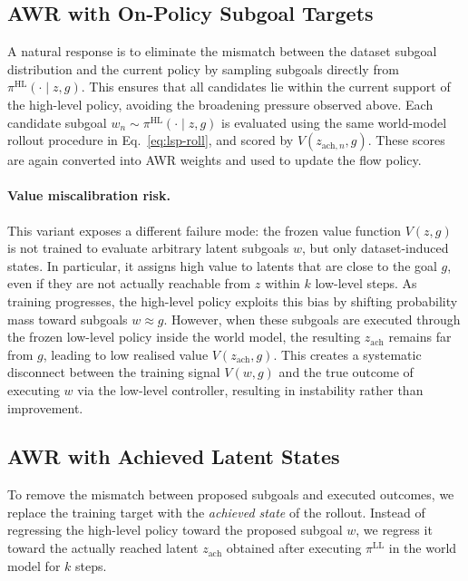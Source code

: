 \subsection{AWR with On-Policy Subgoal Targets}
\label{sec:lsp-awr-self}

A natural response is to eliminate the mismatch between the dataset subgoal distribution and the current policy by sampling subgoals directly from $\pi^{\mathrm{HL}}(\cdot \mid z,g)$. This ensures that all candidates lie within the current support of the high-level policy, avoiding the broadening pressure observed above.
Each candidate subgoal $w_n \sim \pi^{\mathrm{HL}}(\cdot \mid z,g)$ is evaluated using the same world-model rollout procedure in Eq.~\eqref{eq:lsp-roll}, and scored by $V(z_{\mathrm{ach},n}, g)$. These scores are again converted into AWR weights and used to update the flow policy.

\paragraph{Value miscalibration risk.}
This variant exposes a different failure mode: the frozen value function $V(z,g)$ is not trained to evaluate arbitrary latent subgoals $w$, but only dataset-induced states. In particular, it assigns high value to latents that are close to the goal $g$, even if they are not actually reachable from $z$ within $k$ low-level steps.
As training progresses, the high-level policy exploits this bias by shifting probability mass toward subgoals $w \approx g$. However, when these subgoals are executed through the frozen low-level policy inside the world model, the resulting $z_{\mathrm{ach}}$ remains far from $g$, leading to low realised value $V(z_{\mathrm{ach}}, g)$. This creates a systematic disconnect between the training signal $V(w,g)$ and the true outcome of executing $w$ via the low-level controller, resulting in instability rather than improvement.

\subsection{AWR with Achieved Latent States}
\label{sec:lsp-hrf}

To remove the mismatch between proposed subgoals and executed outcomes, we replace the training target with the \emph{achieved state} of the rollout. Instead of regressing the high-level policy toward the proposed subgoal $w$, we regress it toward the actually reached latent $z_{\mathrm{ach}}$ obtained after executing $\pi^{\mathrm{LL}}$ in the world model for $k$ steps.

